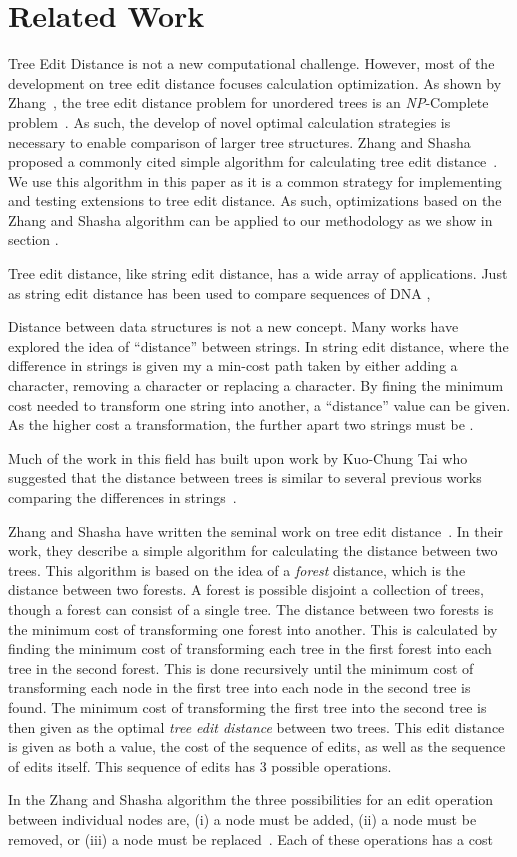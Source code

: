 



\section{Related Work}

Tree Edit Distance is not a new computational challenge. However, most of the development on tree edit distance focuses calculation optimization. As shown by Zhang~\etal, the tree edit distance problem for unordered trees is an \textit{NP}-Complete problem~\cite{zhang_editing_1992}. As such, the develop of novel optimal calculation strategies is necessary to enable comparison of larger tree structures. Zhang and Shasha proposed a commonly cited simple algorithm for calculating tree edit distance~\cite{zhang_simple_1989}. We use this algorithm in this paper as it is a common strategy for implementing and testing extensions to tree edit distance. As such, optimizations based on the Zhang and Shasha algorithm can be applied to our methodology as we show in section .

Tree edit distance, like string edit distance, has a wide array of applications. Just as string edit distance has been used to compare sequences of DNA ,



Distance between data structures is not a new concept. Many works have explored the idea of ``distance'' between strings. In string edit distance, where the difference in strings is given my a min-cost path taken by either adding a character, removing a character or replacing a character. By fining the minimum cost needed to transform one string into another, a ``distance'' value can be given. As the higher cost a transformation, the further apart two strings must be .

Much of the work in this field has built upon work by Kuo-Chung Tai who suggested that the distance between trees is similar to several previous works comparing the differences in strings~\cite{tai_tree--tree_nodate}.


Zhang and Shasha have written the seminal work on tree edit distance~\cite{zhang_simple_1989}. In their work, they describe a simple algorithm for calculating the distance between two trees. This algorithm is based on the idea of a \textit{forest} distance, which is the distance between two forests. A forest is possible disjoint a collection of trees, though a forest can consist of a single tree. The distance between two forests is the minimum cost of transforming one forest into another. This is calculated by finding the minimum cost of transforming each tree in the first forest into each tree in the second forest. This is done recursively until the minimum cost of transforming each node in the first tree into each node in the second tree is found. The minimum cost of transforming the first tree into the second tree is then given as the optimal \emph{tree edit distance} between two trees. This edit distance is given as both a value, the cost of the sequence of edits, as well as the sequence of edits itself. This sequence of edits has 3 possible operations.

In the Zhang and Shasha algorithm the three possibilities for an edit operation between individual nodes are, (i) a node must be added, (ii) a node must be removed, or (iii) a node must be replaced~\cite{zhang_simple_1989}. Each of these operations has a cost
